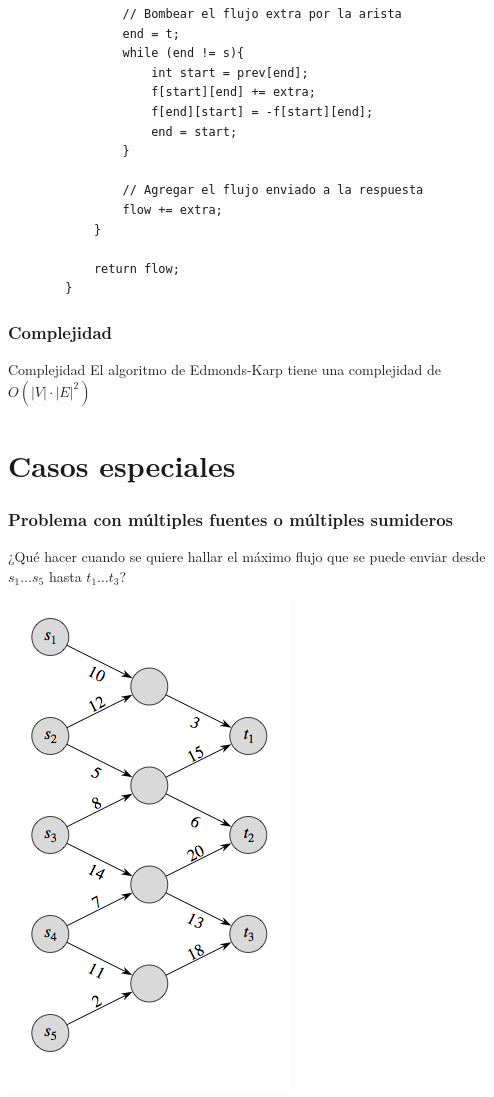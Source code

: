 \documentclass{beamer}
\begin{document}
\begin{frame}
\begin{lstlisting}
		        // Bombear el flujo extra por la arista
		        end = t;
		        while (end != s){
		            int start = prev[end];
		            f[start][end] += extra;
		            f[end][start] = -f[start][end];
		            end = start;
		        }

		        // Agregar el flujo enviado a la respuesta
		        flow += extra;
		    }

		    return flow;
		}
		\end{lstlisting}
	\end{frame}
	
	\begin{frame}
		\frametitle{Complejidad}
		\begin{block}{Complejidad}
			El algoritmo de Edmonds-Karp tiene una complejidad de $O(|V| \cdot |E|^2)$
		\end{block}
	\end{frame}

\section{Casos especiales}
	\begin{frame}
		\frametitle{Problema con múltiples fuentes o múltiples sumideros}
		¿Qué hacer cuando se quiere hallar el máximo flujo que se puede enviar desde $s_1 \ldots s_5$ hasta $t_1 \ldots t_3$?
		\begin{center}
			\includegraphics[height = 0.8\textheight]{Multi-source.png}
		\end{center}
	\end{frame}
	
\end{document}
